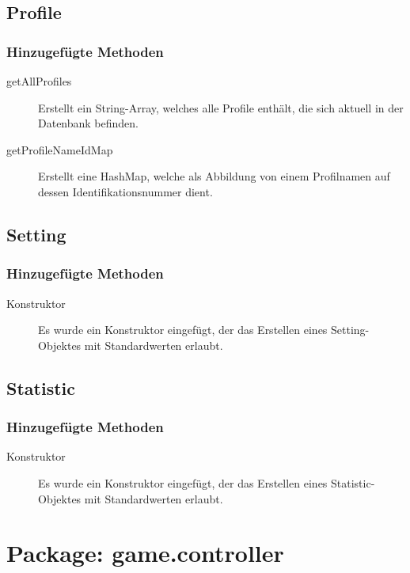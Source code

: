 \documentclass[parskip=full]{scrreprt}
\begin{document}
\subsection{Profile}

\subsubsection{Hinzugefügte Methoden}
\begin{description}
	\item[getAllProfiles] Erstellt ein String-Array, welches alle Profile enthält, die sich aktuell in der Datenbank befinden.
	\item[getProfileNameIdMap] Erstellt eine HashMap, welche als Abbildung von einem Profilnamen auf dessen Identifikationsnummer dient.
\end{description}

\subsection{Setting}

\subsubsection{Hinzugefügte Methoden}
\begin{description}
	\item[Konstruktor] Es wurde ein Konstruktor eingefügt, der das Erstellen eines Setting-Objektes mit Standardwerten erlaubt.
\end{description}

\subsection{Statistic}

\subsubsection{Hinzugefügte Methoden}
\begin{description}
	\item[Konstruktor] Es wurde ein Konstruktor eingefügt, der das Erstellen eines Statistic-Objektes mit Standardwerten erlaubt.
\end{description}

\section{Package: game.controller}
\end{document}
